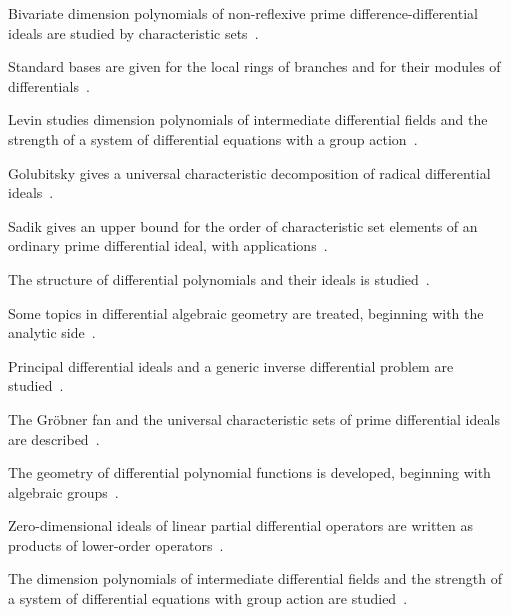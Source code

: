Bivariate dimension polynomials of non-reflexive prime difference-differential
ideals are studied by characteristic
sets~\cite{WlBivariateDimensionPolynomialsO2020}.

Standard bases are given for the local rings of branches and for their modules
of differentials~\cite{WlStandardBasesForLocalRingsOfBr2020}.

Levin studies dimension polynomials of intermediate differential fields and
the strength of a system of differential equations with a group
action~\cite{WlDimensionPolynomialsOfIntermed2020}.

Golubitsky gives a universal characteristic decomposition of radical
differential ideals~\cite{WlUniversalCharacteristicDecompo2020}.

Sadik gives an upper bound for the order of characteristic set elements of an
ordinary prime differential ideal, with
applications~\cite{WlABoundForTheOrderOfCharacteris2020}.

The structure of differential polynomials and their ideals is
studied~\cite{WlOnTheStructureOfDifferentialPo2020}.

Some topics in differential algebraic geometry are treated, beginning with the
analytic side~\cite{WlSomeTopicsInDifferentialAlgebr2020}.

Principal differential ideals and a generic inverse differential problem are
studied~\cite{WlPrincipalDifferentialIdealsAnd2020}.

The Gr\"obner fan and the universal characteristic sets of prime differential
ideals are described~\cite{WlGrBnerFanAndUniversalCharacter2020}.

The geometry of differential polynomial functions is developed, beginning with
algebraic groups~\cite{WlGeometryOfDifferentialPolynomi2020}.

Zero-dimensional ideals of linear partial differential operators are
written as products of lower-order
operators~\cite{WlFactoringZeroDimensionalIdeals2020}.

The dimension polynomials of intermediate differential fields and the strength
of a system of differential equations with group action are
studied~\cite{WlDimensionPolynomialsOfIntermed2020}.
